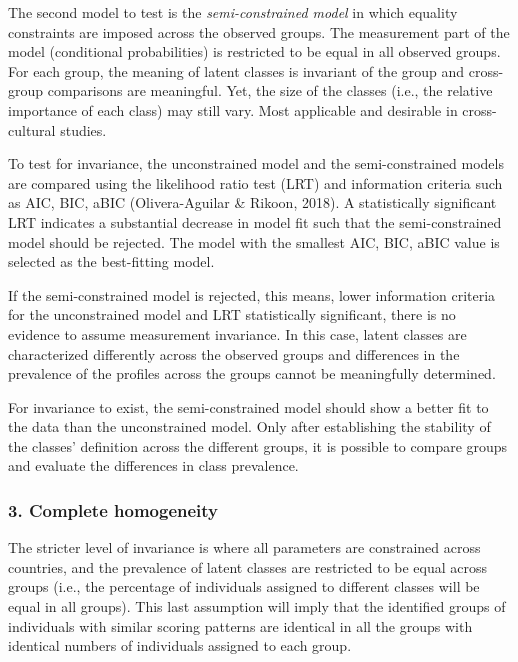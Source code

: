 \documentclass[12pt,a4paper,oneside]{reedthesis}
\begin{document}
The second model to test is the \emph{semi-constrained model} in which equality constraints are imposed across the observed groups. The measurement part of the model (conditional probabilities) is restricted to be equal in all observed groups. For each group, the meaning of latent classes is invariant of the group and cross-group comparisons are meaningful. Yet, the size of the classes (i.e., the relative importance of each class) may still vary. Most applicable and desirable in cross-cultural studies.

To test for invariance, the unconstrained model and the semi-constrained models are compared using the likelihood ratio test (LRT) and information criteria such as AIC, BIC, aBIC (Olivera-Aguilar \& Rikoon, 2018). A statistically significant LRT indicates a substantial decrease in model fit such that the semi-constrained model should be rejected. The model with the smallest AIC, BIC, aBIC value is selected as the best-fitting model.

If the semi-constrained model is rejected, this means, lower information criteria for the unconstrained model and LRT statistically significant, there is no evidence to assume measurement invariance. In this case, latent classes are characterized differently across the observed groups and differences in the prevalence of the profiles across the groups cannot be meaningfully determined.

For invariance to exist, the semi-constrained model should show a better fit to the data than the unconstrained model. Only after establishing the stability of the classes' definition across the different groups, it is possible to compare groups and evaluate the differences in class prevalence.

\hypertarget{complete-homogeneity}{%
\subsubsection{3. Complete homogeneity}\label{complete-homogeneity}}

The stricter level of invariance is where all parameters are constrained across countries, and the prevalence of latent classes are restricted to be equal across groups (i.e., the percentage of individuals assigned to different classes will be equal in all groups). This last assumption will imply that the identified groups of individuals with similar scoring patterns are identical in all the groups with identical numbers of individuals assigned to each group.
\end{document}
